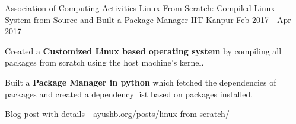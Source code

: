 \begin{cventries}





  \cventry
    {Association of Computing Activities} %
    {\href{https://ayushb.org/posts/linux-from-scratch/}{Linux From Scratch}: Compiled Linux System from Source and Built a Package Manager} %
    {IIT Kanpur} %
    {Feb 2017 - Apr 2017} %
    {
      \begin{cvitems} %
        \item {Created a \textbf{Customized Linux based operating system} by compiling all packages from scratch using the host machine's kernel.}
        \item {Built a \textbf{Package Manager in python} which fetched the dependencies of packages and created a dependency list based on packages installed.} 
        \item {Blog post with details - \href{https://ayushb.org/posts/linux-from-scratch/}{ayushb.org/posts/linux-from-scratch/}}
      \end{cvitems}
    }

\end{cventries}

